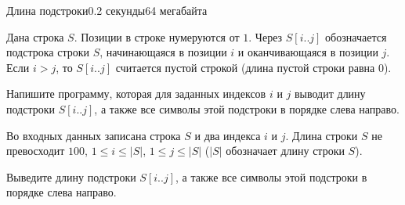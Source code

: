\begin{problem}{Длина подстроки}{}{}{0.2 секунды}{64 мегабайта}

Дана строка $S$.  Позиции в строке нумеруются от $1$. Через $S[i..j]$ обозначается подстрока строки $S$, 
начинающаяся в позиции $i$ и оканчивающаяся в позиции $j$. 
Если $i > j$, то $S[i..j]$ считается пустой строкой (длина пустой строки равна 0). 

Напишите программу, которая для заданных индексов $i$ и $j$ выводит длину подстроки $S[i..j]$, 
а также все символы этой подстроки в порядке слева направо. 

\InputFile
Во входных данных записана строка $S$ и два индекса $i$ и $j$. Длина строки $S$ не превосходит $100$, $1 \le i \le |S|$, $1 \le j \le |S|$
($|S|$ обозначает длину строки $S$).

\OutputFile
Выведите длину подстроки $S[i..j]$, 
а также все символы этой подстроки в порядке слева направо.

\Examples

\begin{example}
%
%
\end{example}

\end{problem}
